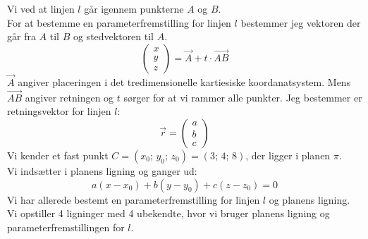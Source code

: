 \begin{tcolorbox}[title=Opgave 4,
    colback=blue!1!white,
    colframe=black,
    colbacktitle=blue!25!white,
    coltitle=red!25!black,
    fonttitle=\bfseries,
    subtitle style={boxrule=0.4pt,
    colback=blue!7!white} ]
    Vi ved at linjen \(l\) går igennem punkterne \(A\) og \(B\).\\
    For at bestemme en parameterfremstilling for linjen \(l\) bestemmer jeg vektoren der går fra \(A\) til \(B\) og stedvektoren til \(A\).\\
    \[\begin{pmatrix} x\\y\\z \end{pmatrix}=\overrightarrow{A}+t\cdot \overrightarrow{AB}\]
    \(\overrightarrow{A}\) angiver placeringen i det tredimensionelle kartiesiske koordanatsystem. Mens \(\overrightarrow{AB}\) angiver retningen og \(t\) sørger for at vi rammer alle punkter.
        Jeg bestemmer er retningsvektor for linjen \(l\):
        \[\overrightarrow{r}=\begin{pmatrix} a \\ b \\ c \end{pmatrix}\]
        Vi kender et fast punkt \(C=(x_0;\, y_0;\, z_0)=(3;\,4;\,8)\), der ligger i planen \(\pi\).\\
        Vi indsætter i planens ligning og ganger ud:
        \[a(x-x_0)+b(y-y_0)+c(z-z_0)=0\]
    Vi har allerede bestemt en parameterfremstilling for linjen \(l\) og planens ligning.\\
    Vi opstiller 4 ligninger med 4 ubekendte, hvor vi bruger planens ligning og parameterfremstillingen for \(l\).
\end{tcolorbox}